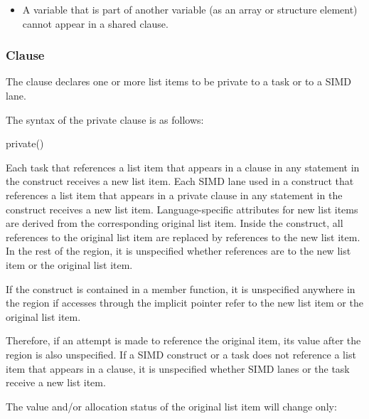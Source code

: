 {{{{\begin{itemize}
\fortranspecificstart
\item A variable that is part of another variable (as an array or structure element) cannot appear in a shared clause.
\fortranspecificend

\end{itemize}







\subsubsection{ Clause}
\label{subsubsec:private clause}
\summary
The  clause declares one or more list items to be private to a task or to a 
SIMD lane.

\syntax
The syntax of the private clause is as follows:

\begin{boxedcode}
private()
\end{boxedcode}

\descr
Each task that references a list item that appears in a  clause in any statement 
in the construct receives a new list item. Each SIMD lane used in a  construct that 
references a list item that appears in a private clause in any statement in the construct 
receives a new list item. Language-specific attributes for new list items are derived from 
the corresponding original list item. Inside the construct, all references to the original 
list item are replaced by references to the new list item. In the rest of the region, it is 
unspecified whether references are to the new list item or the original list item. 

\cppspecificstart
If the construct is contained in a member function, it is unspecified anywhere in the region if accesses through the implicit  pointer refer to the new list item or the original list item.
\cppspecificend

Therefore, if an attempt is made to reference the original item, its value after the region 
is also unspecified. If a SIMD construct or a task does not reference a list item that 
appears in a  clause, it is unspecified whether SIMD lanes or the task receive 
a new list item. 

The value and/or allocation status of the original list item will change only: 

}}}}
